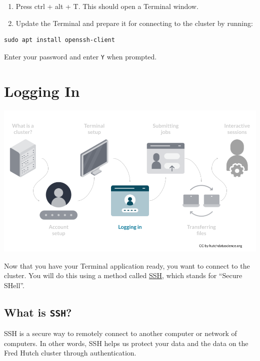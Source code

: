 \documentclass[
]{book}
\begin{document}
\begin{enumerate}
\def\labelenumi{\arabic{enumi}.}
\item
  Press ctrl + alt + T. This should open a Terminal window.
\item
  Update the Terminal and prepare it for connecting to the cluster by running:
\end{enumerate}

\begin{verbatim}
sudo apt install openssh-client
\end{verbatim}

Enter your password and enter \texttt{Y} when prompted.

\hypertarget{logging-in}{%
\chapter{Logging In}\label{logging-in}}

\begin{center}\includegraphics[width=0.8\linewidth]{resources/images/04-logging-in_files/figure-latex//1BQxrVYdKZTbpCaF-i_q9w7s9x034lEXpQZDU-Sl09cs_gff2211b72f_1_206} \end{center}

Now that you have your Terminal application ready, you want to connect to the cluster. You will do this using a method called \href{https://www.ssh.com/academy/ssh/protocol}{SSH}, which stands for ``Secure SHell''.

\hypertarget{what-is-ssh}{%
\section{\texorpdfstring{What is \texttt{SSH}?}{What is SSH?}}\label{what-is-ssh}}

SSH is a secure way to remotely connect to another computer or network of computers. In other words, SSH helps us protect your data and the data on the Fred Hutch cluster through authentication.
\end{document}
